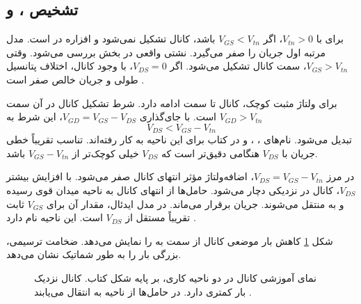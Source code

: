 \subsection{تشخیص ،  و }
برای  با \(V_{tn}>0\)، اگر \(V_{GS}<V_{tn}\) باشد، کانال
 تشکیل نمی‌شود و افزاره در  است.
مدل مرتبه اول جریان را صفر می‌گیرد. نشتی واقعی در بخش  بررسی می‌شود.
وقتی \(V_{GS}>V_{tn}\)، سمت  کانال تشکیل می‌شود.
اگر \(V_{DS}=0\)، با وجود کانال، اختلاف پتانسیل طولی و جریان خالص صفر است
\cite[شکل ]{weste}.

برای ولتاژ  مثبت کوچک، کانال تا سمت  ادامه دارد.
شرط تشکیل کانال در آن سمت \(V_{GD}>V_{tn}\) است.
با جای‌گذاری \(V_{GD}=V_{GS}-V_{DS}\)، این شرط به
\begin{equation}
 V_{DS}<V_{GS}-V_{tn}
 \label{eq:mos-linear-condition}
\end{equation}
تبدیل می‌شود. نام‌های ، ،  و
 در کتاب برای این ناحیه به کار رفته‌اند.
تناسب تقریباً خطی جریان با \(V_{DS}\) هنگامی دقیق‌تر است که \(V_{DS}\) خیلی
کوچک‌تر از \(V_{GS}-V_{tn}\) باشد.

در مرز \(V_{DS}=V_{GS}-V_{tn}\)، اضافه‌ولتاژ مؤثر انتهای کانال صفر می‌شود.
با افزایش بیشتر \(V_{DS}\)، کانال در نزدیکی  دچار 
می‌شود. حامل‌ها از انتهای کانال به ناحیه میدان قوی رسیده و به 
منتقل می‌شوند. جریان برقرار می‌ماند. در مدل  ایدئال، مقدار آن
برای \(V_{GS}\) ثابت تقریباً مستقل از \(V_{DS}\) است. این ناحیه
 نام دارد \cite[صفحات ۶۳ و ۶۴]{weste}.

شکل \ref{fig:mos-channel-shape} کاهش بار موضعی کانال از سمت 
به  را نمایش می‌دهد. ضخامت ترسیمی، بزرگی بار را به طور شماتیک نشان می‌دهد.
\begin{figure}[ht]
\centering
\begin{latin}
\PersianMathDigits
{}
\end{latin}
\caption{نمای آموزشی کانال در دو ناحیه کاری، بر پایه شکل  کتاب.
کانال نزدیک  بار کمتری دارد. در  حامل‌ها از ناحیه
 به  انتقال می‌یابند \cite{weste}.}
\label{fig:mos-channel-shape}
\end{figure}

